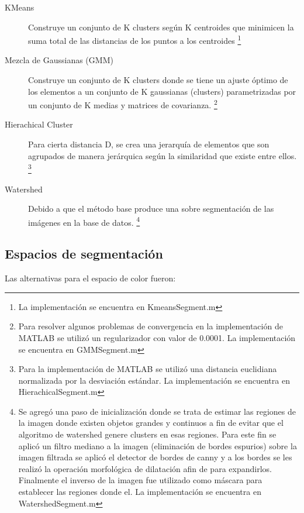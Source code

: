 \documentclass[10pt,twocolumn,letterpaper]{article}
\begin{document}
\begin{description}
\item[KMeans] Construye un conjunto de K clusters según K centroides que minimicen la suma total de las distancias de los puntos a los centroides \footnote{La implementación se encuentra en KmeansSegment.m} \cite{Jain2010}

\item[Mezcla de Gaussianas (GMM)] Construye un conjunto de K clusters donde se tiene un ajuste óptimo de los elementos a un conjunto de K gaussianas (clusters) parametrizadas por un conjunto de K medias y matrices de covarianza. \footnote{Para resolver algunos problemas de convergencia en la implementación de MATLAB se utilizó un regularizador con valor de 0.0001. La implementación se encuentra en GMMSegment.m} \cite{Banfield1993}

\item[Hierachical Cluster] Para cierta distancia D, se crea una jerarquía de elementos que son agrupados de manera jerárquica según la similaridad que existe entre ellos. \footnote{Para la implementación de MATLAB se utilizó una distancia euclidiana normalizada por la desviación estándar. La implementación se encuentra en HierachicalSegment.m} \cite{Arifin2006}

\item[Watershed] Debido a que el método base produce una sobre segmentación  de las imágenes en la base de datos. \footnote{Se agregó una paso de inicialización donde se trata de estimar las regiones de la imagen donde existen objetos grandes y continuos a fin de evitar que el algoritmo de watershed genere clusters en esas regiones. Para este fin  se aplicó un filtro mediano a la imagen (eliminación de bordes espurios) sobre la imagen filtrada se aplicó el detector de bordes de canny y a los bordes se les realizó la operación morfológica de dilatación afin de para expandirlos.  Finalmente el inverso de la imagen fue utilizado como máscara para establecer las regiones donde el. La implementación se encuentra en WatershedSegment.m} \cite{Shafarenko1997}

\end{description}


\subsection{Espacios de segmentación}
Las alternativas para el espacio de color fueron:
\end{document}

